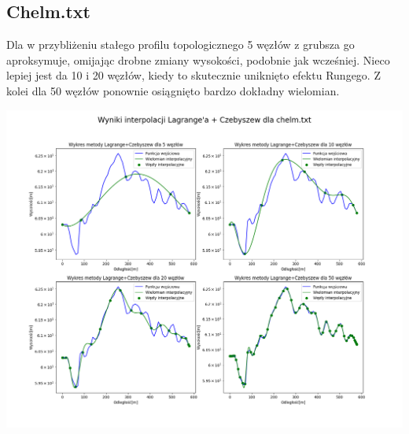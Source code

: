 \documentclass[a4paper,12pt]{article}
\begin{document}
	\subsection{Chelm.txt}
	Dla w przybliżeniu stałego profilu topologicznego 5 węzłów z grubsza go aproksymuje, omijając drobne zmiany wysokości, podobnie jak wcześniej. Nieco lepiej jest da 10 i 20 węzłów, kiedy to skutecznie uniknięto efektu Rungego. Z kolei dla 50 węzłów ponownie osiągnięto bardzo dokładny wielomian.
	\begin{center}
        \includegraphics[scale=0.4]{../charts/chebyshev_chelm.png}
    \end{center}
    
    \newpage
\end{document}
